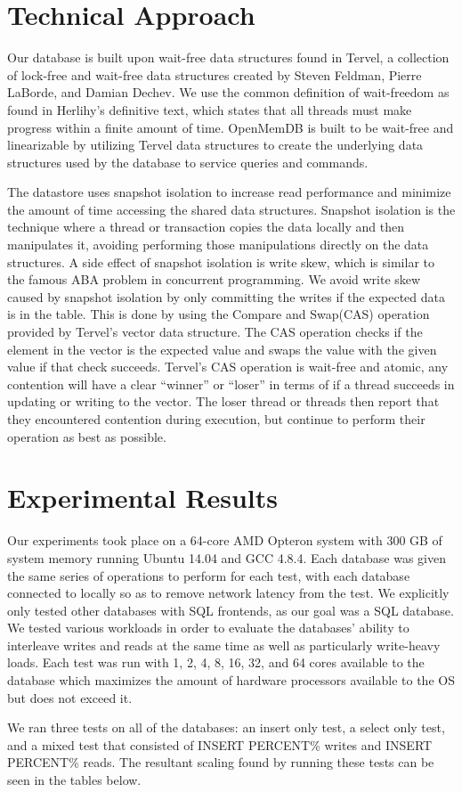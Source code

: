\documentclass[conference, compsoc]{IEEEtran}
\begin{document}
\section{Technical Approach}
Our database is built upon wait-free data structures found in Tervel, a collection of
lock-free and wait-free data structures created by Steven Feldman, Pierre LaBorde, and Damian Dechev\cite{tervel:hazard_pointer}\cite{tervel:hash_map}\cite{tervel:vector}. 
We use the common definition of wait-freedom as found in Herlihy's definitive text, which
states that all threads must make progress within a finite amount of time\cite{herlihy:waitfree}. OpenMemDB is 
built to be wait-free and linearizable by utilizing Tervel data structures to create the 
underlying data structures used by the database to service queries and commands.

The datastore uses snapshot isolation to increase read performance and minimize the amount of time accessing
the shared data structures. Snapshot isolation is the technique where a thread or transaction copies the data
locally and then manipulates it, avoiding performing those manipulations directly on the data structures.
A side effect of snapshot isolation is write skew, which is similar to the famous ABA problem in concurrent
programming. We avoid write skew caused by snapshot isolation by only committing the writes
if the expected data is in the table. This is done by using the Compare and Swap(CAS) operation provided
by Tervel's vector data structure. The CAS operation checks if the element in the vector is the
expected value and swaps the value with the given value if that check succeeds. Tervel's CAS
operation is wait-free and atomic, any contention will have a clear ``winner'' or ``loser'' in terms
of if a thread succeeds in updating or writing to the vector. The loser thread or threads then report
that they encountered contention during execution, but continue to perform their operation as best as 
possible.

\section{Experimental Results}
Our experiments took place on a 64-core AMD Opteron system with 300 GB of system memory running Ubuntu 14.04 and 
GCC 4.8.4. Each database was given the same series of operations to perform for each test, with each database 
connected to locally so as to remove network latency from the test. We explicitly only tested other databases
with SQL frontends, as our goal was a SQL database. We tested various workloads in order to evaluate 
the databases' ability to interleave writes and reads at the same time as well as particularly write-heavy 
loads. Each test was run with 1, 2, 4, 8, 16, 32, and 64 cores available to the database which maximizes the amount of hardware processors
available to the OS but does not exceed it. 
\par\vspace{\baselineskip}
We ran three tests on all of the databases: an insert only test, a select only test, and
a mixed test that consisted of {{INSERT PERCENT}}\% writes and {{INSERT PERCENT}}\% reads.
The resultant scaling found by running these tests can be seen in the tables below. 
\end{document}
